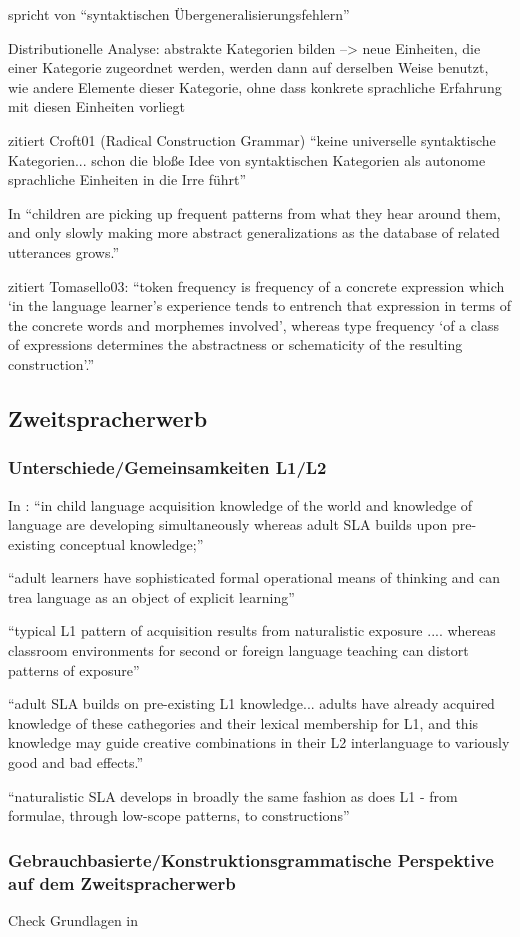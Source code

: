         spricht von ``syntaktischen Übergeneralisierungsfehlern''

        Distributionelle Analyse: abstrakte Kategorien bilden --> neue Einheiten, die einer Kategorie zugeordnet werden, werden dann auf derselben Weise benutzt, wie andere Elemente dieser Kategorie, ohne dass konkrete sprachliche Erfahrung mit diesen Einheiten vorliegt

        \cite{Tomasello06} zitiert Croft01 (Radical Construction Grammar) ``keine universelle syntaktische Kategorien... schon die bloße Idee von syntaktischen Kategorien als autonome sprachliche Einheiten in die Irre führt''

        In \cite{Ellis08} ``children are picking up frequent patterns from what they hear around them, and only slowly making more abstract generalizations as the database of related utterances grows.''

        \cite{Eskildsen08} zitiert Tomasello03: ``token frequency is frequency of a concrete
        expression which ‘in the language learner’s experience tends to entrench
        that expression in terms of the concrete words and morphemes involved’,
        whereas type frequency ‘of a class of expressions determines the abstractness
        or schematicity of the resulting construction’.''

\subsection{Zweitspracherwerb}
\subsubsection{Unterschiede/Gemeinsamkeiten L1/L2}

        In \cite{Ellis08}: ``in child language acquisition knowledge of the world and knowledge of language are developing simultaneously whereas adult SLA builds upon pre-existing conceptual knowledge;''

        ``adult learners have sophisticated formal operational means of thinking and can trea language as an object of explicit learning''

        ``typical L1 pattern of acquisition results from naturalistic exposure .... whereas classroom environments for second or foreign language teaching can distort patterns of exposure''

        ``adult SLA builds on pre-existing L1 knowledge... adults have already acquired knowledge of these cathegories and their lexical membership for L1, and this knowledge may guide creative combinations in their L2 interlanguage to variously good and bad effects.''

        ``naturalistic SLA develops in broadly the same fashion as does L1 - from formulae, through low-scope patterns, to constructions''

\subsubsection{Gebrauchbasierte/Konstruktionsgrammatische Perspektive auf dem Zweitspracherwerb}

Check Grundlagen in \cite{Ziem13}

